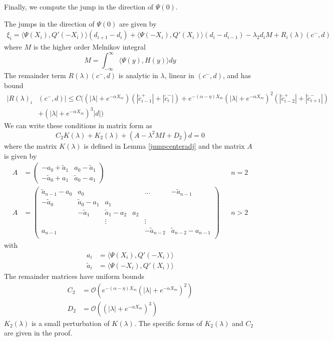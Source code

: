 \documentclass[thesis.tex]{subfiles}
\begin{document}
Finally, we compute the jump in the direction of $\Psi(0)$.
\begin{lemma}\label{jumpadj}
The jumps in the direction of $\Psi(0)$ are given by
\begin{align}\label{xi}
\xi_i = \langle \Psi(X_i), Q'(-X_i) \rangle (d_{i+1} - d_i)
+ \langle \Psi(-X_i), Q'(X_i) \rangle (d_i - d_{i-1})
- \lambda_2 d_i M + R_i(\lambda)(c^-, d)
\end{align}
where $M$ is the higher order Melnikov integral
\begin{equation}\label{M}
M = \int_{-\infty}^\infty \langle \Psi(y), H(y) \rangle dy 
\end{equation}
The remainder term $R(\lambda)(c^-, d)$ is analytic in $\lambda$, linear in $(c^-, d)$, and has bound
\begin{align*}
|R(\lambda)_i&(c^-, d)| \leq C \Big( (|\lambda| + e^{-\alpha X_m})(|\tilde{c}_{i-1}^+| + |\tilde{c}_{i}^-|) + e^{-(\alpha - \eta) X_m}(|\lambda| + e^{-\alpha X_m})^2(|\tilde{c}_{i-2}^+| + |\tilde{c}_{i+1}^-|) \\
&+ (|\lambda| + e^{-\alpha X_m})^3 |d| \Big) \nonumber
\end{align*}
We can write these conditions in matrix form as
\begin{equation}
C_2 K(\lambda) + K_2(\lambda) + (A - \lambda^2 M I + D_2)d = 0
\end{equation}
where the matrix $K(\lambda)$ is defined in Lemma \ref{jumpcenteradj} and the matrix $A$ is given by
\begin{align*}
A &= \begin{pmatrix}
-a_0 + \tilde{a}_1 & a_0 - \tilde{a}_1 \\
-\tilde{a}_0 + a_1 & \tilde{a}_0 - a_1
\end{pmatrix} && n = 2 \\
A &= \begin{pmatrix}
\tilde{a}_{n-1} - a_0 & a_0 & & & \dots & -\tilde{a}_{n-1}\\
-\tilde{a}_0 & \tilde{a}_0 - a_1 &  a_1 \\
& -\tilde{a}_1 & \tilde{a}_1 - a_2 &  a_2 \\
& & \vdots & & \vdots \\
a_{n-1} & & & & -\tilde{a}_{n-2} & \tilde{a}_{n-2} - a_{n-1} \\
\end{pmatrix} && n > 2
\end{align*}
with
\begin{align*}
a_i &= \langle \Psi(X_i), Q'(-X_i) \rangle \\
\tilde{a}_i &= \langle \Psi(-X_i), Q'(X_i) \rangle
\end{align*}
The remainder matrices have uniform bounds
\begin{align*}
C_2 &= \mathcal{O}(e^{-(\alpha - \eta) X_m}(|\lambda| + e^{-\alpha X_m})^2) \\
D_2 &= \mathcal{O}((|\lambda| + e^{-\alpha X_m})^3)
\end{align*}
$K_2(\lambda)$ is a small perturbation of $K(\lambda)$. The specific forms of $K_2(\lambda)$ and $C_2$ are given in the proof.


\end{lemma}
\end{document}
